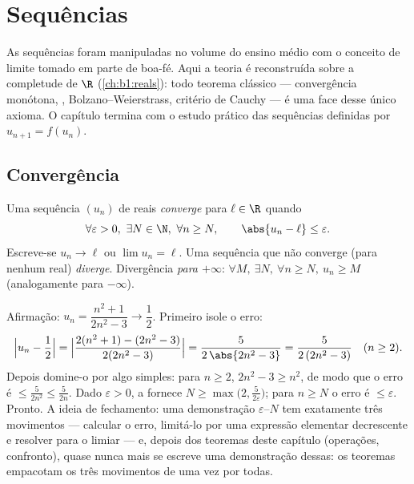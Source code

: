 \chapter{Sequências}\label{ch:b1:seq}

As sequências foram manipuladas no volume do ensino médio com o conceito
de limite tomado em parte de boa-fé. Aqui a teoria é reconstruída sobre
a completude de $\R$ (\cref{ch:b1:reals}): todo teorema clássico
--- convergência monótona, , Bolzano--Weierstrass,
critério de Cauchy --- é uma face desse único axioma. O capítulo
termina com o estudo prático das sequências definidas por $u_{n+1} =
f(u_n)$.

\section{Convergência}

\begin{definition}\label{def:b1:seq:limit}
Uma sequência $(u_n)$ de reais \emph{converge} para $\ell \in \R$
quando
\[
\forall \varepsilon > 0,\ \exists N \in \N,\ \forall n \geq N,
\qquad \abs{u_n - \ell} \leq \varepsilon .
\]
Escreve-se $u_n \to \ell$ ou $\lim u_n = \ell$. Uma sequência que não
converge (para nenhum real) \emph{diverge}. Divergência \emph{para
$+\infty$}: $\forall M,\ \exists N,\ \forall n \geq N,\ u_n \geq M$
(analogamente para $-\infty$).
\end{definition}

\begin{example}\label{ex:b1:seq:epsilonN}
Afirmação: $u_n = \dfrac{n^2 + 1}{2n^2 - 3} \to \dfrac12$. Primeiro
isole o erro:
\[
\Bigl| u_n - \frac12 \Bigr|
= \Bigl| \frac{2(n^2 + 1) - (2n^2 - 3)}{2(2n^2 - 3)} \Bigr|
= \frac{5}{2\,\abs{2n^2 - 3}}
= \frac{5}{2\,(2n^2 - 3)} \quad (n \geq 2).
\]
Depois domine-o por algo simples: para $n \geq 2$, $2n^2 - 3
\geq n^2$, de modo que o erro é $\leq \frac{5}{2n^2} \leq \frac 5{2n}$.
Dado $\varepsilon > 0$, a  fornece $N \geq
\max\bigl(2, \frac{5}{2\varepsilon}\bigr)$; para $n \geq N$ o
erro é $\leq \varepsilon$. Pronto. A ideia de fechamento: uma demonstração
$\varepsilon$--$N$ tem exatamente três movimentos --- calcular o
erro, limitá-lo por uma expressão elementar decrescente e resolver para
o limiar --- e, depois dos teoremas deste capítulo (operações,
confronto), quase nunca mais se escreve uma demonstração dessas: os
teoremas empacotam os três movimentos de uma vez por todas.
\end{example}

